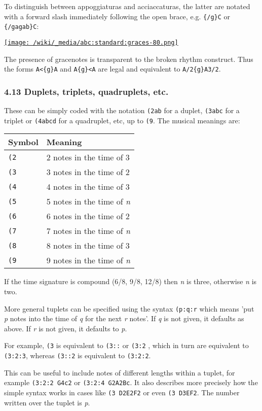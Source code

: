 To distinguish between appoggiaturas and acciaccaturas, the latter are
notated with a forward slash immediately following the open brace, e.g.
\texttt{\{/g\}C} or \texttt{\{/gagab\}C}:

\href{/wiki/_detail/abc:standard:graces-80.png?id=abc\%3Astandard\%3Av2.1}{\texttt{[image: /wiki/\_media/abc:standard:graces-80.png]}}

The presence of gracenotes is transparent to the broken rhythm
construct. Thus the forms \texttt{A\textless{}\{g\}A} and
\texttt{A\{g\}\textless{}A} are legal and equivalent to
\texttt{A/2\{g\}A3/2}.

\hypertarget{duplets_triplets_quadruplets_etc}{\subsubsection{4.13
Duplets, triplets, quadruplets,
etc.}\label{duplets_triplets_quadruplets_etc}}

These can be simply coded with the notation \texttt{(2ab} for a duplet,
\texttt{(3abc} for a triplet or \texttt{(4abcd} for a quadruplet, etc,
up to \texttt{(9}. The musical meanings are:

\begin{longtable}[]{@{}ll@{}}
\toprule
\textbf{Symbol} & \textbf{Meaning}\tabularnewline
\midrule
\endhead
\texttt{(2} & 2 notes in the time of 3\tabularnewline
\texttt{(3} & 3 notes in the time of 2\tabularnewline
\texttt{(4} & 4 notes in the time of 3\tabularnewline
\texttt{(5} & 5 notes in the time of \emph{n}\tabularnewline
\texttt{(6} & 6 notes in the time of 2\tabularnewline
\texttt{(7} & 7 notes in the time of \emph{n}\tabularnewline
\texttt{(8} & 8 notes in the time of 3\tabularnewline
\texttt{(9} & 9 notes in the time of \emph{n}\tabularnewline
\bottomrule
\end{longtable}

If the time signature is compound (6/8, 9/8, 12/8) then \emph{n} is
three, otherwise \emph{n} is two.

More general tuplets can be specified using the syntax \texttt{(p:q:r}
which means 'put \emph{p} notes into the time of \emph{q} for the next
\emph{r} notes'. If \emph{q} is not given, it defaults as above. If
\emph{r} is not given, it defaults to \emph{p}.

For example, \texttt{(3} is equivalent to \texttt{(3::} or \texttt{(3:2}
, which in turn are equivalent to \texttt{(3:2:3}, whereas
\texttt{(3::2} is equivalent to \texttt{(3:2:2}.

This can be useful to include notes of different lengths within a
tuplet, for example \texttt{(3:2:2\ G4c2} or \texttt{(3:2:4\ G2A2Bc}. It
also describes more precisely how the simple syntax works in cases like
\texttt{(3\ D2E2F2} or even \texttt{(3\ D3EF2}. The number written over
the tuplet is \emph{p}.

